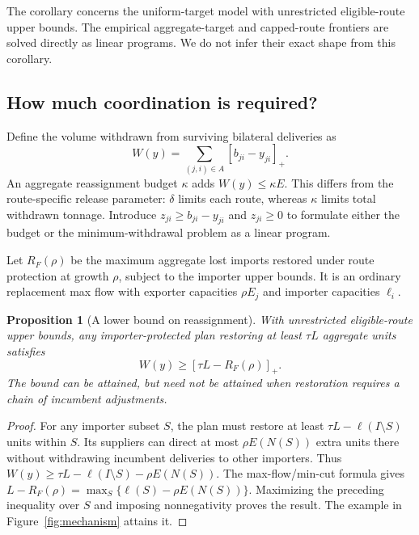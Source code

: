 \documentclass[11pt,a4paper]{article}
\newtheorem{proposition}{Proposition}
\newcommand{\pos}[1]{\left[#1\right]_+}
\begin{document}
The corollary concerns the uniform-target model with unrestricted eligible-route upper bounds. The empirical aggregate-target and capped-route frontiers are solved directly as linear programs. We do not infer their exact shape from this corollary.

\subsection{How much coordination is required?}
Define the volume withdrawn from surviving bilateral deliveries as
\begin{equation}W(y)=\sum_{(j,i)\in A}\pos{b_{ji}-y_{ji}}.\label{eq:withdrawal}\end{equation}
An aggregate reassignment budget $\kappa$ adds $W(y)\leq\kappa E$. This differs from the route-specific release parameter: $\delta$ limits each route, whereas $\kappa$ limits total withdrawn tonnage. Introduce $z_{ji}\geq b_{ji}-y_{ji}$ and $z_{ji}\geq0$ to formulate either the budget or the minimum-withdrawal problem as a linear program.

Let $R_F(\rho)$ be the maximum aggregate lost imports restored under route protection at growth $\rho$, subject to the importer upper bounds. It is an ordinary replacement max flow with exporter capacities $\rho E_j$ and importer capacities $\ell_i$.
\begin{proposition}[A lower bound on reassignment]\label{prop:withdrawal}
With unrestricted eligible-route upper bounds, any importer-protected plan restoring at least $\tau L$ aggregate units satisfies
\begin{equation}W(y)\geq\pos{\tau L-R_F(\rho)}.\label{eq:withdrawbound}\end{equation}
The bound can be attained, but need not be attained when restoration requires a chain of incumbent adjustments.
\end{proposition}
\begin{proof}
For any importer subset $S$, the plan must restore at least $\tau L-\ell(I\setminus S)$ units within $S$. Its suppliers can direct at most $\rho E(N(S))$ extra units there without withdrawing incumbent deliveries to other importers. Thus $W(y)\geq\tau L-\ell(I\setminus S)-\rho E(N(S))$. The max-flow/min-cut formula gives $L-R_F(\rho)=\max_S\{\ell(S)-\rho E(N(S))\}$. Maximizing the preceding inequality over $S$ and imposing nonnegativity proves the result. The example in Figure~\ref{fig:mechanism} attains it.
\end{proof}
\end{document}
